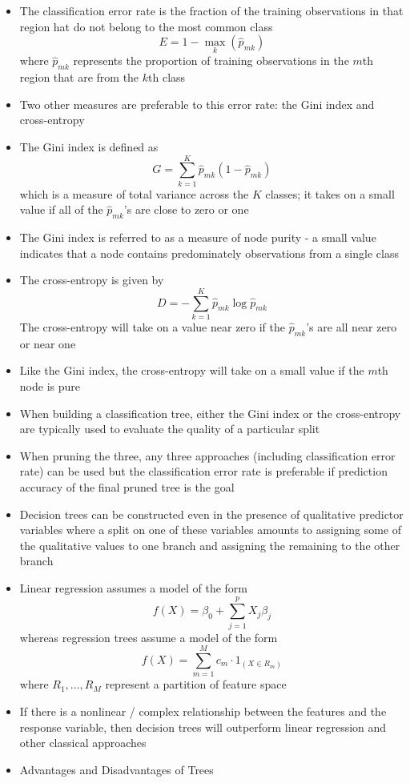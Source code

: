 \documentclass[12pt]{article}
\begin{document}
\begin{itemize}
\item The classification error rate is the fraction of the training observations in that region hat do not belong to the most common class $$ E = 1 - \max_k (\hat{p}_{mk}) $$ where $\hat{p}_{mk}$ represents the proportion of training observations in the $m$th region that are from the $k$th class 
\item Two other measures are preferable to this error rate: the Gini index and cross-entropy
\item The Gini index is defined as $$ G = \sum_{k=1}^K \hat{p}_{mk}(1 - \hat{p}_{mk}) $$ which is a measure of total variance across the $K$ classes; it takes on a small value if all of the $\hat{p}_{mk}$'s are close to zero or one
\item The Gini index is referred to as a measure of node purity - a small value indicates that a node contains predominately observations from a single class 
\item The cross-entropy is given by $$ D = -\sum_{k=1}^K \hat{p}_{mk}\log \hat{p}_{mk} $$ The cross-entropy will take on a value near zero if the $\hat{p}_{mk}$'s are all near zero or near one 
\item Like the Gini index, the cross-entropy will take on a small value if the $m$th node is pure 
\item When building a classification tree, either the Gini index or the cross-entropy are typically used to evaluate the quality of a particular split
\item When pruning the three, any three approaches (including classification error rate) can be used but the classification error rate is preferable if prediction accuracy of the final pruned tree is the goal 
\item Decision trees can be constructed even in the presence of qualitative predictor variables where a split on one of these variables amounts to assigning some of the qualitative values to one branch and assigning the remaining to the other branch 
\item Linear regression assumes a model of the form $$ f(X) = \beta_0 + \sum_{j=1}^p X_j\beta_j $$ whereas regression trees assume a model of the form $$ f(X) = \sum_{m=1}^M c_m \cdot 1_{(X \in R_m)} $$ where $R_1,\dots,R_M$ represent a partition of feature space 
\item If there is a nonlinear / complex relationship between the features and the response variable, then decision trees will outperform linear regression and other classical approaches 
\item Advantages and Disadvantages of Trees \begin{itemize} 

\end{itemize}
\end{itemize}
\end{document}
